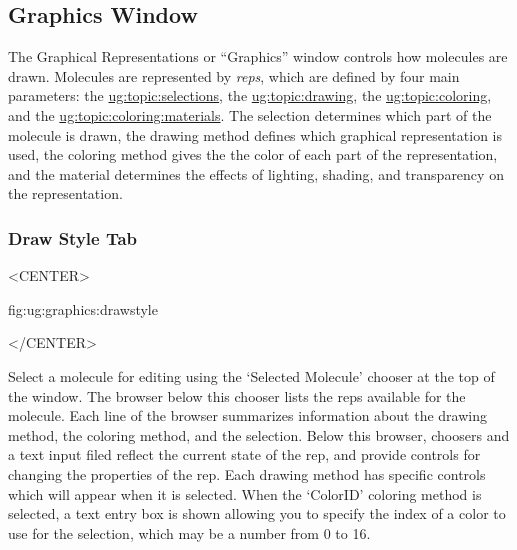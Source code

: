 %
%
%


\subsection{Graphics Window}
\label{ug:ui:window:graphics}

The {\sf Graphical Representations} or ``Graphics'' window controls how 
molecules are drawn.  Molecules are represented by {\it reps}, 
which are defined by four main parameters: the
\hyperref{selection}{selection [\S~}{]}{ug:topic:selections}, the
\hyperref{drawing method}{drawing method [\S~}{]}{ug:topic:drawing}, the 
\hyperref{coloring method}{coloring method [\S~}{]}{ug:topic:coloring},
and the \hyperref{material}{material [\S~}{]}{ug:topic:coloring:materials}.
The selection determines which part of the
molecule is drawn, the drawing method defines which graphical
representation is used, the coloring method gives the the color
of each part of the representation, and the material determines
the effects of lighting, shading, and transparency on the representation.

\subsubsection{Draw Style Tab}
\begin{rawhtml}
<CENTER>
\end{rawhtml}
{fig:ug:graphics:drawstyle}
\begin{rawhtml}
</CENTER>
\end{rawhtml}

Select a molecule for editing using the `Selected Molecule' chooser
at the top of the window.  The browser below this chooser lists the
reps available for the molecule.  Each line of the browser summarizes 
information about the drawing method, the coloring method, and the
selection.  Below this browser, choosers and a text input filed reflect 
the current state of the rep, and provide controls for changing the
properties of the rep.  Each drawing method has specific controls 
which will appear when it is selected.
\label{ug:ui:window:graphics:controls}
\label{ug:ui:window:graphics:material}
When the `ColorID' coloring method is selected,
a text entry box is shown allowing you to specify the index of a color
to use for the selection, which may be a number from 0 to 16.

